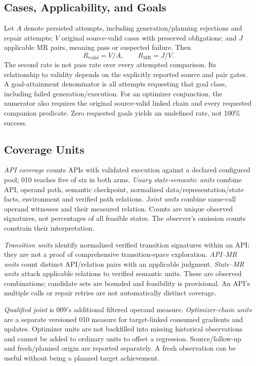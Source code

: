 \documentclass[conference]{IEEEtran}
\begin{document}
\subsection{Cases, Applicability, and Goals}
Let $A$ denote persisted attempts, including generation/planning rejections and repair attempts; $V$ original source-valid cases with preserved obligations; and $J$ applicable MR pairs, meaning pass or suspected failure. Then
\begin{equation}
 R_{\mathrm{valid}}=V/A,\qquad R_{\mathrm{MR}}=J/V.
\end{equation}
The second rate is not pass rate over every attempted comparison. Its relationship to validity depends on the explicitly reported source and pair gates. A goal-attainment denominator is all attempts requesting that goal class, including failed generation/execution. For an optimizer conjunction, the numerator also requires the original source-valid linked chain and every requested companion predicate. Zero requested goals yields an undefined rate, not 100\% success.

\subsection{Coverage Units}
\emph{API coverage} counts APIs with validated execution against a declared configured pool; 010 reaches five of six in both arms. \emph{Unary state-semantic units} combine API, operand path, semantic checkpoint, normalized data/representation/state facts, environment and verified path relations. \emph{Joint units} combine same-call operand witnesses and their measured relation. Counts are unique observed signatures, not percentages of all feasible states. The observer's omission counts constrain their interpretation.

\emph{Transition units} identify normalized verified transition signatures within an API; they are not a proof of comprehensive transition-space exploration. \emph{API--MR units} count distinct API/relation pairs with an applicable judgment. \emph{State--MR units} attach applicable relations to verified semantic units. These are observed combinations; candidate sets are bounded and feasibility is provisional. An API's multiple calls or repair retries are not automatically distinct coverage.

\emph{Qualified joint} is 009's additional filtered operand measure. \emph{Optimizer-chain units} are a separate versioned 010 measure for target-linked consumed gradients and updates. Optimizer units are not backfilled into missing historical observations and cannot be added to ordinary units to offset a regression. Source/follow-up and fresh/planned origin are reported separately. A fresh observation can be useful without being a planned target achievement.
\end{document}
